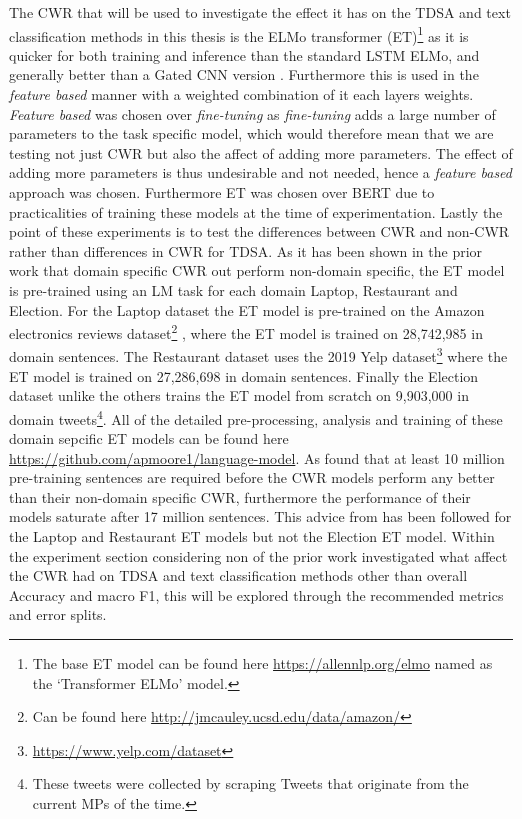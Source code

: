 The CWR that will be used to investigate the effect it has on the TDSA and text classification methods in this thesis is the ELMo transformer (ET)\footnote{The base ET model can be found here \url{https://allennlp.org/elmo} named as the `Transformer ELMo' model.} as it is quicker for both training and inference than the standard LSTM ELMo, and generally better than a Gated CNN version \citep{peters-etal-2018-dissecting}. Furthermore this is used in the \textit{feature based} manner with a weighted combination of it each layers weights. \textit{Feature based} was chosen over \textit{fine-tuning} as \textit{fine-tuning} adds a large number of parameters to the task specific model, which would therefore mean that we are testing not just CWR but also the affect of adding more parameters. The effect of adding more parameters is thus undesirable and not needed, hence a \textit{feature based} approach was chosen. Furthermore ET was chosen over BERT due to practicalities of training these models at the time of experimentation. Lastly the point of these experiments is to test the differences between CWR and non-CWR rather than differences in CWR for TDSA. As it has been shown in the prior work that domain specific CWR out perform non-domain specific, the ET model is pre-trained using an LM task for each domain Laptop, Restaurant and Election. For the Laptop dataset the ET model is pre-trained on the Amazon electronics reviews dataset\footnote{Can be found here \url{http://jmcauley.ucsd.edu/data/amazon/}} \citep{mcauley2015image}, where the ET model is trained on 28,742,985 in domain sentences. The Restaurant dataset uses the 2019 Yelp dataset\footnote{\url{https://www.yelp.com/dataset}} where the ET model is trained on 27,286,698 in domain sentences. Finally the Election dataset unlike the others trains the ET model from scratch on 9,903,000 in domain tweets\footnote{These tweets were collected by scraping Tweets that originate from the current MPs of the time.}. All of the detailed pre-processing, analysis and training of these domain sepcific ET models can be found here \url{https://github.com/apmoore1/language-model}. As \citet{rietzler2019adapt} found that at least 10 million pre-training sentences are required before the CWR models perform any better than their non-domain specific CWR, furthermore the performance of their models saturate after 17 million sentences. This advice from \citet{rietzler2019adapt} has been followed for the Laptop and Restaurant ET models but not the Election ET model. Within the experiment section considering non of the prior work investigated what affect the CWR had on TDSA and text classification methods other than overall Accuracy and macro F1, this will be explored through the recommended metrics and error splits. 

